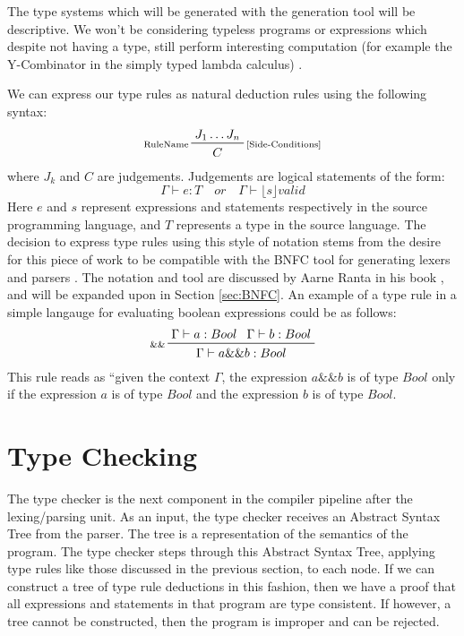 \documentclass{UoYCSproject}
\begin{document}
The type systems which will be generated with the generation tool will be
descriptive. We won't be considering typeless programs or expressions which
despite not having a type, still perform interesting computation (for example
the Y-Combinator in the simply typed lambda calculus)\cite{NeilJones} \cite[p.~28]{SimonPeytonJones}
\cite[p.~155]{SimonPeytonJones}.

We can express our type rules as natural deduction rules using the following
syntax:
\begin{displaymath}
    \prftree[l,r]{\scriptsize [Side-Conditions]}{\scriptsize RuleName}{J_1 \dots J_n}{C}
\end{displaymath}
where $J_k$ and $C$ are judgements. Judgements are logical statements of the form:
\begin{displaymath}
    \Gamma \vdash e:T \quad or \quad \Gamma \vdash \lfloor s \rfloor valid
\end{displaymath}
Here $e$ and $s$ represent expressions and statements respectively in the source
programming language, and $T$ represents a type in the source language. The
decision to express type rules using this style of notation stems from the desire
for this piece of work to be compatible with the BNFC tool for generating lexers
and parsers \cite{BNFC}. The notation and tool are discussed by Aarne Ranta in
his book \cite{Ranta}, and will be expanded upon in Section \ref{sec:BNFC}. An example
of a type rule in a simple langauge for evaluating boolean expressions could be
as follows:
\begin{displaymath}
    \prftree[l]{\scriptsize \&\&}{\Gamma \vdash a:Bool}{\Gamma \vdash b:Bool}{\Gamma \vdash a \&\& b: Bool}
\end{displaymath}
This rule reads as ``given the context $\Gamma$, the expression $a \&\& b$
is of type $Bool$ only if the expression $a$ is of type $Bool$ and the expression $b$
is of type $Bool$.

\section{Type Checking}
\label{sec:Chap1TypeChecking}
The type checker is the next component in the compiler pipeline after the
lexing/parsing unit. As an input, the type checker receives an Abstract Syntax
Tree from the parser. The tree is a representation of the semantics of the
program. The type checker steps through this Abstract Syntax Tree, applying
type rules like those discussed in the previous section, to each node. If we
can construct a tree of type rule deductions in this fashion, then we have a
proof that all expressions and statements in that program are type consistent.
If however, a tree cannot be constructed, then the program is improper and
can be rejected.
\end{document}
